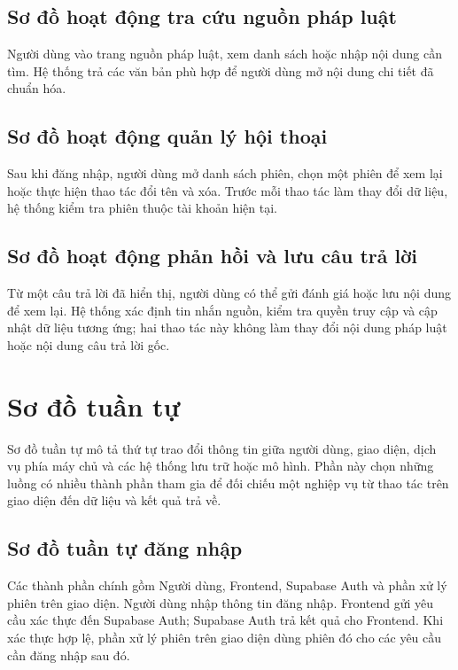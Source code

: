 \documentclass[12pt,a4paper,oneside]{report}
\begin{document}
\subsection{Sơ đồ hoạt động tra cứu nguồn pháp luật}
Người dùng vào trang nguồn pháp luật, xem danh sách hoặc nhập nội dung cần tìm. Hệ thống trả các văn bản phù hợp để người dùng mở nội dung chi tiết đã chuẩn hóa.

\subsection{Sơ đồ hoạt động quản lý hội thoại}
Sau khi đăng nhập, người dùng mở danh sách phiên, chọn một phiên để xem lại hoặc thực hiện thao tác đổi tên và xóa. Trước mỗi thao tác làm thay đổi dữ liệu, hệ thống kiểm tra phiên thuộc tài khoản hiện tại.

\subsection{Sơ đồ hoạt động phản hồi và lưu câu trả lời}
Từ một câu trả lời đã hiển thị, người dùng có thể gửi đánh giá hoặc lưu nội dung để xem lại. Hệ thống xác định tin nhắn nguồn, kiểm tra quyền truy cập và cập nhật dữ liệu tương ứng; hai thao tác này không làm thay đổi nội dung pháp luật hoặc nội dung câu trả lời gốc.

\section{Sơ đồ tuần tự}
Sơ đồ tuần tự mô tả thứ tự trao đổi thông tin giữa người dùng, giao diện, dịch vụ phía máy chủ và các hệ thống lưu trữ hoặc mô hình. Phần này chọn những luồng có nhiều thành phần tham gia để đối chiếu một nghiệp vụ từ thao tác trên giao diện đến dữ liệu và kết quả trả về.

\subsection{Sơ đồ tuần tự đăng nhập}
Các thành phần chính gồm Người dùng, Frontend, Supabase Auth và phần xử lý phiên trên giao diện. Người dùng nhập thông tin đăng nhập. Frontend gửi yêu cầu xác thực đến Supabase Auth; Supabase Auth trả kết quả cho Frontend. Khi xác thực hợp lệ, phần xử lý phiên trên giao diện dùng phiên đó cho các yêu cầu cần đăng nhập sau đó.
\end{document}
